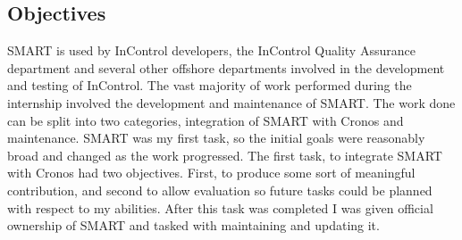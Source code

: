 \documentclass[a4paper, 11pt, titlepage]{article}
\begin{document}
 
\subsection{Objectives} 
SMART is used by InControl developers, the InControl Quality Assurance department and several other offshore departments involved in the development and testing of InControl. The vast majority of work performed during the internship involved the development and maintenance of SMART. The work done can be split into two categories, integration of SMART with Cronos and maintenance. 
SMART was my first task, so the initial goals were reasonably broad and changed as the work progressed. The first task, to integrate SMART with Cronos had two objectives. First, to produce some sort of meaningful contribution, and second to allow evaluation so future tasks could be planned with respect to my abilities. After this task was completed I was given official ownership of SMART and tasked with maintaining and updating it.  
 
 
\end{document}
